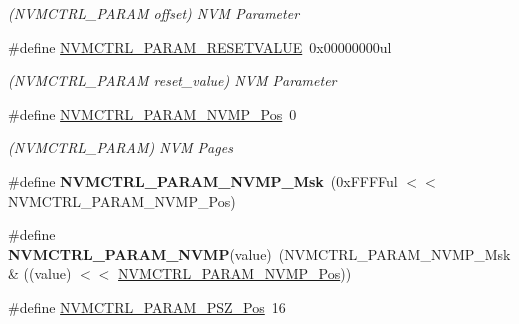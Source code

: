 \begin{DoxyCompactItemize}
\begin{DoxyCompactList}\small\item\em (N\+V\+M\+C\+T\+R\+L\+\_\+\+P\+A\+R\+A\+M offset) N\+V\+M Parameter \end{DoxyCompactList}\item 
\hypertarget{group___s_a_m_l21___n_v_m_c_t_r_l_ga70c3c90bcb2318bb472cc9565751ff04}{}\#define \hyperlink{group___s_a_m_l21___n_v_m_c_t_r_l_ga70c3c90bcb2318bb472cc9565751ff04}{N\+V\+M\+C\+T\+R\+L\+\_\+\+P\+A\+R\+A\+M\+\_\+\+R\+E\+S\+E\+T\+V\+A\+L\+U\+E}~0x00000000ul\label{group___s_a_m_l21___n_v_m_c_t_r_l_ga70c3c90bcb2318bb472cc9565751ff04}

\begin{DoxyCompactList}\small\item\em (N\+V\+M\+C\+T\+R\+L\+\_\+\+P\+A\+R\+A\+M reset\+\_\+value) N\+V\+M Parameter \end{DoxyCompactList}\item 
\hypertarget{group___s_a_m_l21___n_v_m_c_t_r_l_ga08f9f5de86a6c44ce2d6ecdb9f995443}{}\#define \hyperlink{group___s_a_m_l21___n_v_m_c_t_r_l_ga08f9f5de86a6c44ce2d6ecdb9f995443}{N\+V\+M\+C\+T\+R\+L\+\_\+\+P\+A\+R\+A\+M\+\_\+\+N\+V\+M\+P\+\_\+\+Pos}~0\label{group___s_a_m_l21___n_v_m_c_t_r_l_ga08f9f5de86a6c44ce2d6ecdb9f995443}

\begin{DoxyCompactList}\small\item\em (N\+V\+M\+C\+T\+R\+L\+\_\+\+P\+A\+R\+A\+M) N\+V\+M Pages \end{DoxyCompactList}\item 
\hypertarget{group___s_a_m_l21___n_v_m_c_t_r_l_ga767641a1cda9faa90b0b721f356158c7}{}\#define {\bfseries N\+V\+M\+C\+T\+R\+L\+\_\+\+P\+A\+R\+A\+M\+\_\+\+N\+V\+M\+P\+\_\+\+Msk}~(0x\+F\+F\+F\+Ful $<$$<$ N\+V\+M\+C\+T\+R\+L\+\_\+\+P\+A\+R\+A\+M\+\_\+\+N\+V\+M\+P\+\_\+\+Pos)\label{group___s_a_m_l21___n_v_m_c_t_r_l_ga767641a1cda9faa90b0b721f356158c7}

\item 
\hypertarget{group___s_a_m_l21___n_v_m_c_t_r_l_gabe03070a8e72b6577e46fa73ad53e552}{}\#define {\bfseries N\+V\+M\+C\+T\+R\+L\+\_\+\+P\+A\+R\+A\+M\+\_\+\+N\+V\+M\+P}(value)~(N\+V\+M\+C\+T\+R\+L\+\_\+\+P\+A\+R\+A\+M\+\_\+\+N\+V\+M\+P\+\_\+\+Msk \& ((value) $<$$<$ \hyperlink{group___s_a_m_l21___n_v_m_c_t_r_l_ga08f9f5de86a6c44ce2d6ecdb9f995443}{N\+V\+M\+C\+T\+R\+L\+\_\+\+P\+A\+R\+A\+M\+\_\+\+N\+V\+M\+P\+\_\+\+Pos}))\label{group___s_a_m_l21___n_v_m_c_t_r_l_gabe03070a8e72b6577e46fa73ad53e552}

\item 
\hypertarget{group___s_a_m_l21___n_v_m_c_t_r_l_gabec5624158a60a0f0d0b8a62afe18af8}{}\#define \hyperlink{group___s_a_m_l21___n_v_m_c_t_r_l_gabec5624158a60a0f0d0b8a62afe18af8}{N\+V\+M\+C\+T\+R\+L\+\_\+\+P\+A\+R\+A\+M\+\_\+\+P\+S\+Z\+\_\+\+Pos}~16\label{group___s_a_m_l21___n_v_m_c_t_r_l_gabec5624158a60a0f0d0b8a62afe18af8}


\end{DoxyCompactItemize}
